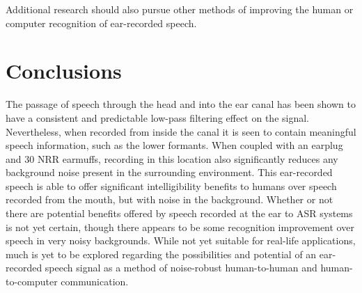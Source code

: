 Additional research should also pursue other methods of improving the human or computer recognition of ear-recorded speech. 


\section{Conclusions}\label{chap5:conclusions}

The passage of speech through the head and into the ear canal has been shown to have a consistent and predictable low-pass filtering effect on the signal.  Nevertheless, when recorded from inside the canal it is seen to contain meaningful speech information, such as the lower formants.  When coupled with an earplug and 30 NRR earmuffs, recording in this location also significantly reduces any background noise present in the surrounding environment.  This ear-recorded speech is able to offer significant intelligibility benefits to humans over speech recorded from the mouth, but with noise in the background.  Whether or not there are potential benefits offered by speech recorded at the ear to ASR systems is not yet certain, though there appears to be some recognition improvement over speech in very noisy backgrounds. While not yet suitable for real-life applications, much is yet to be explored regarding the possibilities and potential of an ear-recorded speech signal as a method of noise-robust human-to-human and human-to-computer communication.





